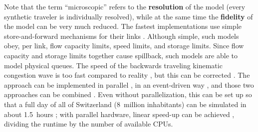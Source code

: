 Note that the term ``microscopic'' refers to the \textbf{resolution}
of the model (every synthetic traveler is individually resolved),
while at the same time the \textbf{fidelity} of the model can be very
much reduced.  The fastest implementations use simple
store-and-forward mechanisms for their links
\citep{SimaoQueueing,Gawron1998IterativeAlgorithmto,GawronPhd,BottomThesis}.
Although simple, such models obey, per link, flow capacity limits,
speed limits, and storage limits.  Since flow capacity and storage
limits together cause spillback, such models are able to model
physical queues.  The speed of the backwards traveling kinematic
congestion wave is too fast compared to reality
\citep{SimonNagel1999queueTrb}, but this can be corrected
\citep{Charypar2008PhD,osorio-2010c}.  The approach can be implemented in parallel
\citep{CetinBurriNagel2003queue}, in an event-driven way
\citep{CharyparAxhausenEtAl2007Event-DrivenQueueBasedTraffic}, and
those two approaches can be combined
\citep{CharyparAxhausenEtAl2007event-drivenparallelqueue-based}.  Even
without parallelization, this can be set up so that a full day of all
of Switzerland (8~million inhabitants) can be simulated in about
1.5~hours \citep{WaraichEtc2009JDQSim}; with parallel hardware, linear
speed-up can be achieved
\citep{CetinBurriNagel2003queue,CharyparAxhausenEtAl2007event-drivenparallelqueue-based},
dividing the runtime by the number of available CPUs.





